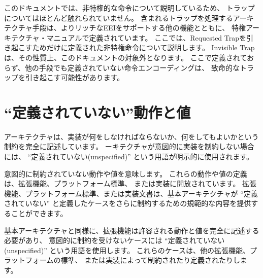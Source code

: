 このドキュメントでは、非特権的な命令について説明しているため、
トラップについてはほとんど触れられていません。 
含まれるトラップを処理するアーキテクチャ手段は、よりリッチなEEIをサポートする他の機能とともに、
特権アーキテクチャ・マニュアルで定義されています。 
ここでは、Requested Trapを引き起こすためだけに定義された非特権命令について説明します。
Invisible Trapは、その性質上、このドキュメントの対象外となります。
ここで定義されておらず、他の手段でも定義されていない命令エンコーディングは、
致命的なトラップを引き起こす可能性があります。

\begin{comment}
\section{UNSPECIFIED Behaviors and Values}

The architecture fully describes what implementations must do and any
constraints on what they may do.  In cases where the architecture
intentionally does not constrain implementations, the term \unspecified\
is explicitly used.

The term \unspecified\ refers to a behavior or value that is
intentionally unconstrained.  The definition of these behaviors or
values is open to extensions, platform standards, or implementations.
Extensions, platform standards, or implementation documentation may
provide normative content to further constrain cases that the base
architecture defines as \unspecified.

Like the base architecture, extensions should fully describe allowable
behavior and values and use the term \unspecified\ for cases that are
intentionally unconstrained.  These cases may be constrained or defined
by other extensions, platform standards, or implementations.
\end{comment}

\section{``定義されていない''動作と値}

アーキテクチャは、実装が何をしなければならないか、何をしてもよいかという制約を完全に記述しています。
ーキテクチャが意図的に実装を制約しない場合には、 ``定義されていない(unspecified)'' という用語が明示的に使用されます。

意図的に制約されていない動作や値を意味します。
これらの動作や値の定義は、拡張機能、プラットフォーム標準、
または実装に開放されています。
拡張機能、プラットフォーム標準、または実装文書は、基本アーキテクチャが ``定義されていない'' 
と定義したケースをさらに制約するための規範的な内容を提供することができます。

基本アーキテクチャと同様に、拡張機能は許容される動作と値を完全に記述する必要があり、
意図的に制約を受けないケースには ``定義されていない(unspecified)'' という用語を使用します。 
これらのケースは、他の拡張機能、プラットフォームの標準、
または実装によって制約されたり定義されたりします。
